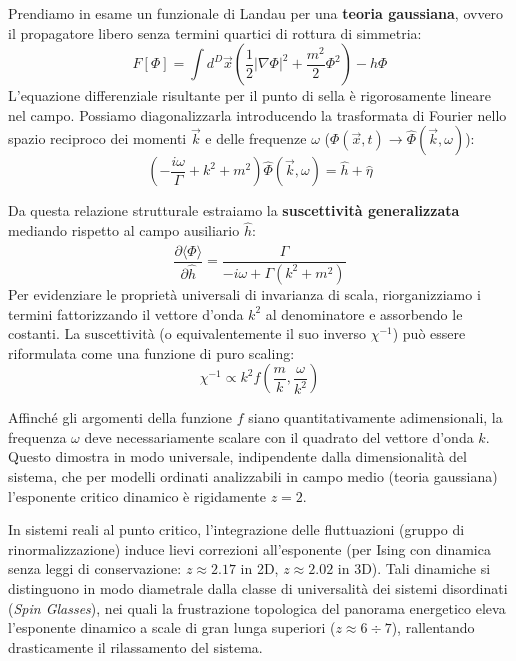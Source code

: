 Prendiamo in esame un funzionale di Landau per una \textbf{teoria gaussiana}, ovvero il propagatore libero senza termini quartici di rottura di simmetria:
\begin{equation}
    F[\Phi] = \int d^D \vec{x} \left( \frac{1}{2} |\nabla \Phi|^2 + \frac{m^2}{2} \Phi^2 \right) - h\Phi
\end{equation}
L'equazione differenziale risultante per il punto di sella è rigorosamente lineare nel campo. Possiamo diagonalizzarla introducendo la trasformata di Fourier nello spazio reciproco dei momenti $\vec{k}$ e delle frequenze $\omega$ ($\Phi(\vec{x}, t) \to \hat{\Phi}(\vec{k}, \omega)$):
\begin{equation}
    \left( - \frac{i\omega}{\Gamma} + k^2 + m^2 \right) \hat{\Phi}(\vec{k}, \omega) = \hat{h} + \hat{\eta}
\end{equation}

Da questa relazione strutturale estraiamo la \textbf{suscettività generalizzata} mediando rispetto al campo ausiliario $\hat{h}$:
\begin{equation}
    \frac{\partial \langle \hat{\Phi} \rangle}{\partial \hat{h}} = \frac{\Gamma}{-i\omega + \Gamma(k^2 + m^2)} 
\end{equation}
Per evidenziare le proprietà universali di invarianza di scala, riorganizziamo i termini fattorizzando il vettore d'onda $k^2$ al denominatore e assorbendo le costanti. La suscettività (o equivalentemente il suo inverso $\chi^{-1}$) può essere riformulata come una funzione di puro scaling:
\begin{equation}
    \chi^{-1} \propto k^2 f\left( \frac{m}{k}, \frac{\omega}{k^2} \right)
\end{equation}


Affinché gli argomenti della funzione $f$ siano quantitativamente adimensionali, la frequenza $\omega$ deve necessariamente scalare con il quadrato del vettore d'onda $k$. Questo dimostra in modo universale, indipendente dalla dimensionalità del sistema, che per modelli ordinati analizzabili in campo medio (teoria gaussiana) l'esponente critico dinamico è rigidamente \textbf{$z = 2$}.

In sistemi reali al punto critico, l'integrazione delle fluttuazioni (gruppo di rinormalizzazione) induce lievi correzioni all'esponente (per Ising con dinamica senza leggi di conservazione: $z \approx 2.17$ in 2D, $z \approx 2.02$ in 3D). Tali dinamiche si distinguono in modo diametrale dalla classe di universalità dei sistemi disordinati (\textit{Spin Glasses}), nei quali la frustrazione topologica del panorama energetico eleva l'esponente dinamico a scale di gran lunga superiori ($z \approx 6 \div 7$), rallentando drasticamente il rilassamento del sistema.




